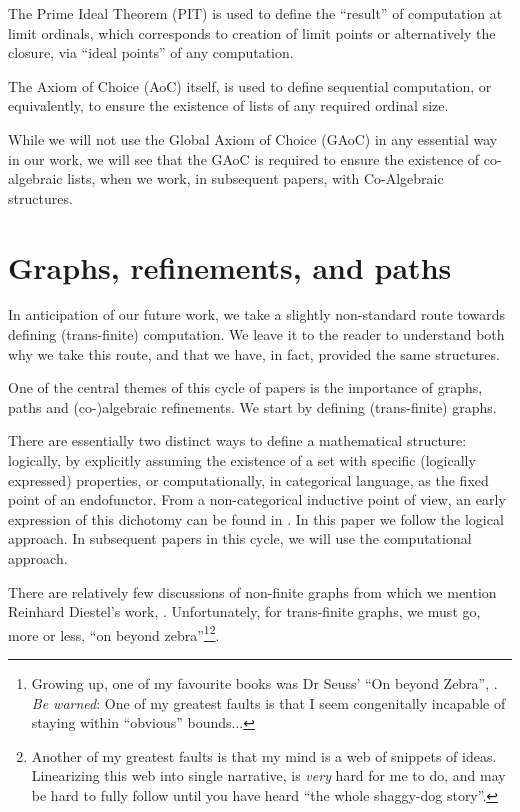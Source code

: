 \documentclass[a4paper,openany]{amsart}
\begin{document}
The Prime Ideal Theorem (PIT) is used to define the ``result'' of computation at
limit ordinals, which corresponds to creation of limit points or alternatively
the closure, via ``ideal points'' of any computation.

The Axiom of Choice (AoC) itself, is used to define sequential computation, or
equivalently, to ensure the existence of lists of any required ordinal size.

While we will not use the Global Axiom of Choice (GAoC) in any essential way in
our work, we will see that the GAoC is required to ensure the existence of
co-algebraic lists, when we work, in subsequent papers, with Co-Algebraic
structures.

\section{Graphs, refinements, and paths}

In anticipation of our future work, we take a slightly non-standard route towards defining
(trans-finite) computation. We leave it to the reader to understand both why we take
this route, and that we have, in fact, provided the same structures.

One of the central themes of this cycle of papers is the importance of graphs, paths and
(co-)algebraic refinements. We start by defining (trans-finite) graphs.

There are essentially two distinct ways to define a mathematical structure: logically, by
explicitly assuming the existence of a set with specific (logically expressed) properties,
or computationally, in categorical language, as the fixed point of an endofunctor. From a
non-categorical inductive point of view, an early expression of this dichotomy can be
found in \cite[page 1]{moschovakis1974induction}. In this paper we follow the logical
approach. In subsequent papers in this cycle, we will use the computational approach.

There are relatively few discussions of non-finite graphs from which we mention Reinhard
Diestel's work, \cite{diestel2006graphTheory, diestel1990infiniteGraphTheory}.
Unfortunately, for trans-finite graphs, we must go, more or less, ``on beyond
zebra''\footnote{Growing up, one of my favourite books was Dr Seuss' ``On beyond Zebra'',
\cite{seuss1955onBeyondZebra}. \emph{Be warned}: One of my greatest faults is that I seem
congenitally incapable of staying within ``obvious'' bounds...}\footnote{Another of my
greatest faults is that my mind is a web of snippets of ideas. Linearizing this web into
single narrative, is \emph{very} hard for me to do, and may be hard to fully follow until 
you have heard ``the whole shaggy-dog story''.}.
\end{document}
